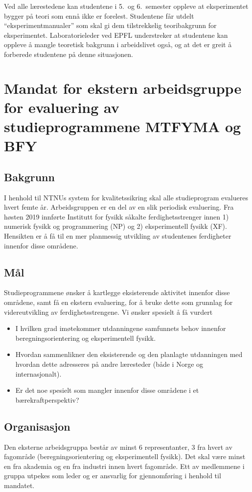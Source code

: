 \documentclass{article}
\begin{document}
Ved alle lærestedene kan studentene i 5.~og 6.~semester oppleve at eksperimentet bygger på teori som ennå ikke er forelest. Studentene får utdelt ``eksperimentmanualer'' som skal gi dem tilstrekkelig teoribakgrunn for eksperimentet. Laboratorieleder ved EPFL understreker at studentene kan oppleve å mangle teoretisk bakgrunn i arbeidslivet også, og at det er greit å forberede studentene på denne situasjonen.

\section{Mandat for ekstern arbeidsgruppe for evaluering av studieprogrammene MTFYMA og BFY}
\subsection{Bakgrunn}
I henhold til NTNUs system for kvalitetssikring skal alle studieprogram evalueres hvert femte år. Arbeidsgruppen er en del av en slik periodisk evaluering. Fra høsten 2019 innførte Institutt for fysikk såkalte ferdighetsstrenger innen 1) numerisk fysikk og programmering (NP) og 2) eksperimentell fysikk (XF). Hensikten er å få til en mer planmessig utvikling av studentenes ferdigheter innenfor disse områdene.

\subsection{Mål}
Studieprogrammene ønsker å kartlegge eksisterende aktivitet innenfor disse områdene, samt få en ekstern evaluering, for å bruke dette som grunnlag for videreutvikling av ferdighetsstrengene.
Vi ønsker spesielt å få vurdert
\begin{itemize}
  \item I hvilken grad imøtekommer utdanningene samfunnets behov innenfor beregningsorientering og eksperimentell fysikk.
  \item Hvordan sammenlikner den eksisterende og den planlagte utdanningen med hvordan dette adresseres på andre læresteder (både i Norge og internasjonalt).
  \item Er det noe spesielt som mangler innenfor disse områdene i et bærekraftperspektiv?
\end{itemize}

\subsection{Organisasjon}
Den eksterne arbeidsgruppa består av minst 6 representanter, 3 fra hvert av fagområde (beregningsorientering og eksperimentell fysikk). Det skal være minst en fra akademia og en fra industri innen hvert fagområde.
Ett av medlemmene i gruppa utpekes som leder og er ansvarlig for gjennomføring i henhold til mandatet.
\end{document}
